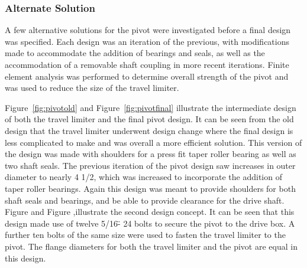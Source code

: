 \subsubsection{Alternate Solution}

A few alternative solutions for the pivot were investigated before a final design was specified. Each design was an iteration of the previous, with modifications made to accommodate the addition of bearings and seals, as well as the accommodation of a removable shaft coupling in more recent iterations. Finite element analysis was performed to determine overall strength of the pivot and was used to reduce the size of the travel limiter.

Figure~\ref{fig:pivotold} and Figure~\ref{fig:pivotfinal} illustrate the intermediate design of both the travel limiter and the final pivot design. It can be seen from the old design that the travel limiter underwent design change where the final design is less complicated to make and was overall a more efficient solution. This version of the design was made with shoulders for a press fit taper roller bearing as well as two shaft seals. The previous iteration of the pivot design saw increases in outer diameter to nearly 4 1/2\?, which was increased to incorporate the addition of taper roller bearings. Again this design was meant to provide shoulders for both shaft seals and bearings, and be able to provide clearance for the drive shaft. Figure and Figure ,illustrate the second design concept. It can be seen that this design made use of twelve 5/16\" - 24 bolts to secure the pivot to the drive box. A further ten bolts of the same size were used to fasten the travel limiter to the pivot. The flange diameters for both the travel limiter and the pivot are equal in this design.

